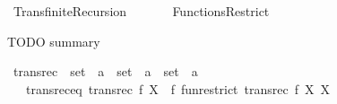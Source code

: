 %
\begin{isabellebody}%
%
%
\isadelimdocument
%
\endisadelimdocument
%
\isatagdocument
\isanewline
%
\isamarkuptrue%
%
\endisatagdocument
{\isafolddocument}%
%
\isadelimdocument
%
\endisadelimdocument
%
\isadelimtheory
%
\endisadelimtheory
%
\isatagtheory
{}\isamarkupfalse%
\ Transfinite{\isacharunderscore}{\kern0pt}Recursion\isanewline
\ \ \isanewline
\ \ \ \ Functions{\isacharunderscore}{\kern0pt}Restrict\isanewline
{}%
\endisatagtheory
{\isafoldtheory}%
%
\isadelimtheory
%
\endisadelimtheory
%
\isadelimdocument
%
\endisadelimdocument
%
\isatagdocument
%
\isamarkuptrue%
%
\endisatagdocument
{\isafolddocument}%
%
\isadelimdocument
%
\endisadelimdocument
%
\begin{isamarkuptext}%
TODO summary%
\end{isamarkuptext}\isamarkuptrue%
\isamarkupfalse%
\ transrec\ {\isacharcolon}{\kern0pt}{\isacharcolon}{\kern0pt}\ {\isachardoublequoteopen}{\isacharparenleft}{\kern0pt}{\isacharparenleft}{\kern0pt}set\ {\isasymRightarrow}\ {\isacharprime}{\kern0pt}a{\isacharparenright}{\kern0pt}\ {\isasymRightarrow}\ set\ {\isasymRightarrow}\ {\isacharprime}{\kern0pt}a{\isacharparenright}{\kern0pt}\ {\isasymRightarrow}\ set\ {\isasymRightarrow}\ {\isacharprime}{\kern0pt}a{\isachardoublequoteclose}\isanewline
\ \ \ transrec{\isacharunderscore}{\kern0pt}eq{\isacharcolon}{\kern0pt}\ {\isachardoublequoteopen}transrec\ f\ X\ {\isacharequal}{\kern0pt}\ f\ {\isacharparenleft}{\kern0pt}fun{\isacharunderscore}{\kern0pt}restrict\ {\isacharparenleft}{\kern0pt}transrec\ f{\isacharparenright}{\kern0pt}\ X{\isacharparenright}{\kern0pt}\ X{\isachardoublequoteclose}\isanewline
%
\isadelimtheory
\isanewline
%
\endisadelimtheory
%
\isatagtheory
{}\isamarkupfalse%
%
\endisatagtheory
{\isafoldtheory}%
%
\isadelimtheory
%
\endisadelimtheory
%
\end{isabellebody}%
\endinput
